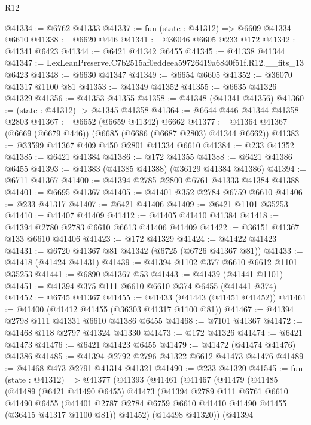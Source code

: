 \begin{lexlean}{R12}
\begin{coremodule}
@41334 := @6762 @41333
@41337 := fun (state : @41312) => @6609 @41334 @6610
@41338 := @6620 @446
@41341 := @36046 @6605 @233 @172
@41342 := @41341 @6423
@41344 := @6421 @41342 @6455
@41345 := @41338 @41344
@41347 := LexLeanPreserve.C7b2515af0eddeea59726419a6840f51f.R12.__fits_13 @6423
@41348 := @6630 @41347
@41349 := @6654 @6605
@41352 := @36070 @41317 @1100 @81
@41353 := @41349 @41352
@41355 := @6635 @41326 @41329
@41356 := @41353 @41355
@41358 := @41348 (@41341 @41356)
@41360 := (state : @41312) -> @41345 @41358
@41364 := @6644 @446 @41344 @41358 @2803
@41367 := @6652 (@6659 @41342) @6662
@41377 := @41364 @41367 (@6669 (@6679 @446)) (@6685 (@6686 (@6687 @2803) @41344 @6662))
@41383 := @33599 @41367 @409 @450 @2801 @41334 @6610
@41384 := @233 @41352
@41385 := @6421 @41384
@41386 := @172 @41355
@41388 := @6421 @41386 @6455
@41393 := @41383 (@41385 @41388) (@36129 @41384 @41386)
@41394 := @6711 @41367
@41400 := @41394 @2785 @2800 @6761 @41333 @41384 @41388
@41401 := @6695 @41367
@41405 := @41401 @352 @2784 @6759 @6610
@41406 := @233 @41317
@41407 := @6421 @41406
@41409 := @6421 @1101 @35253
@41410 := @41407 @41409
@41412 := @41405 @41410 @41384
@41418 := @41394 @2780 @2783 @6610 @6613 @41406 @41409
@41422 := @36151 @41367 @133 @6610 @41406
@41423 := @172 @41329
@41424 := @41422 @41423
@41431 := @6720 @41367 @81 @41342 (@6725 (@6726 @41367 @81))
@41433 := @41418 (@41424 @41431)
@41439 := @41394 @1102 @377 @6610 @6612 @1101 @35253
@41441 := @6890 @41367 @53
@41443 := @41439 (@41441 @1101)
@41451 := @41394 @375 @111 @6610 @6610 @374 @6455 (@41441 @374)
@41452 := @6745 @41367
@41455 := @41433 (@41443 (@41451 @41452))
@41461 := @41400 (@41412 @41455 (@36303 @41317 @1100 @81))
@41467 := @41394 @2798 @111 @41331 @6610 @41386 @6455
@41468 := @7101 @41367
@41472 := @41468 @118 @2797 @41324 @41330
@41473 := @172 @41326
@41474 := @6421 @41473
@41476 := @6421 @41423 @6455
@41479 := @41472 (@41474 @41476) @41386
@41485 := @41394 @2792 @2796 @41322 @6612 @41473 @41476
@41489 := @41468 @473 @2791 @41314 @41321
@41490 := @233 @41320
@41545 := fun (state : @41312) =>
  @41377
    (@41393
      (@41461
        (@41467
          (@41479
            (@41485
              (@41489
                (@6421 @41490 @6455)
                @41473
                (@41394
                  @2789
                  @111
                  @6761
                  @6610
                  @41490
                  @6455
                  (@41401 @2787 @2784 @6759 @6610 @41410 @41490 @41455 (@36415 @41317 @1100 @81))
                  @41452)
                (@14498 @41320))
              (@41394

\end{coremodule}
\end{lexlean}
